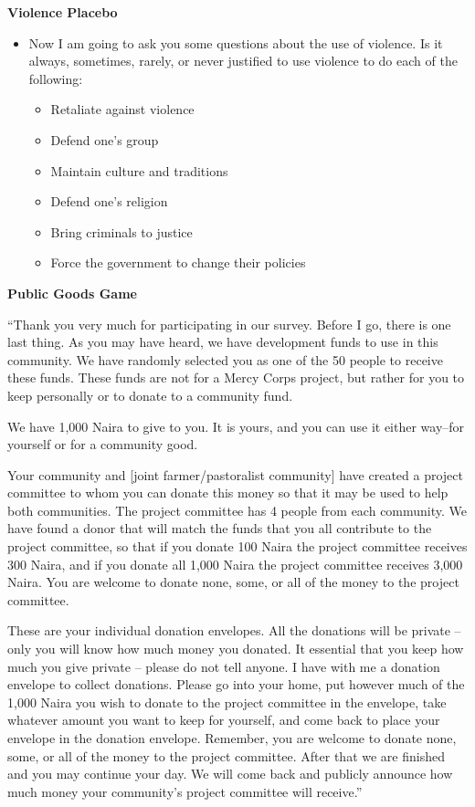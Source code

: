 \documentclass[
]{article}
\providecommand{\tightlist}{%
  \setlength{\itemsep}{0pt}\setlength{\parskip}{0pt}}
\begin{document}
\textbf{Violence Placebo}

\begin{itemize}
\tightlist
\item
  Now I am going to ask you some questions about the use of violence. Is
  it always, sometimes, rarely, or never justified to use violence to do
  each of the following:

  \begin{itemize}
  \tightlist
  \item
    Retaliate against violence
  \item
    Defend one's group
  \item
    Maintain culture and traditions
  \item
    Defend one's religion
  \item
    Bring criminals to justice
  \item
    Force the government to change their policies
  \end{itemize}
\end{itemize}

\textbf{Public Goods Game}

``Thank you very much for participating in our survey. Before I go,
there is one last thing. As you may have heard, we have development
funds to use in this community. We have randomly selected you as one of
the 50 people to receive these funds. These funds are not for a Mercy
Corps project, but rather for you to keep personally or to donate to a
community fund.

We have 1,000 Naira to give to you. It is yours, and you can use it
either way--for yourself or for a community good.

Your community and {[}joint farmer/pastoralist community{]} have created
a project committee to whom you can donate this money so that it may be
used to help both communities. The project committee has 4 people from
each community. We have found a donor that will match the funds that you
all contribute to the project committee, so that if you donate 100 Naira
the project committee receives 300 Naira, and if you donate all 1,000
Naira the project committee receives 3,000 Naira. You are welcome to
donate none, some, or all of the money to the project committee.

These are your individual donation envelopes. All the donations will be
private -- only you will know how much money you donated. It essential
that you keep how much you give private -- please do not tell anyone. I
have with me a donation envelope to collect donations. Please go into
your home, put however much of the 1,000 Naira you wish to donate to the
project committee in the envelope, take whatever amount you want to keep
for yourself, and come back to place your envelope in the donation
envelope. Remember, you are welcome to donate none, some, or all of the
money to the project committee. After that we are finished and you may
continue your day. We will come back and publicly announce how much
money your community's project committee will receive.''
\end{document}
